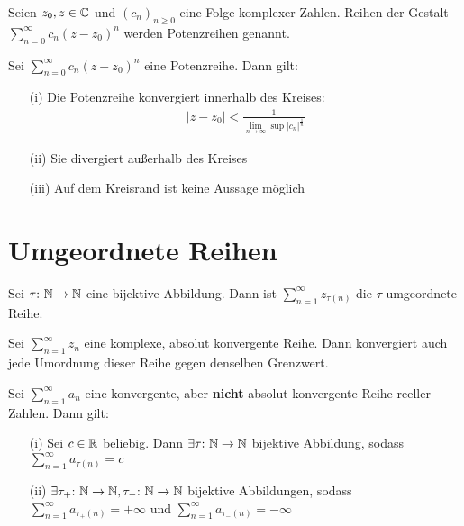 \begin{frameddefn}[Potenzreihen]
	Seien $z_0, z \in \mathbb{C}$ und $(c_n)_{n\geq 0}$ eine Folge komplexer Zahlen. Reihen der Gestalt\\ $\sum_{n=0}^{\infty} c_n (z-z_0)^n$ werden Potenzreihen genannt.
\end{frameddefn}

\begin{framedthm}
	Sei $\sum_{n=0}^{\infty} c_n (z-z_0)^n$ eine Potenzreihe. Dann gilt:
	\begin{enumerate}
		\item[(i)] Die Potenzreihe konvergiert innerhalb des Kreises:
		\begin{align*}
		|z-z_0| < \frac{1}{\lim\limits_{n \to \infty} \sup |c_n|^\frac{1}{n}}
		\end{align*}
		\item [(ii)] Sie divergiert außerhalb des Kreises
		\item[(iii)] Auf dem Kreisrand ist keine Aussage möglich
	\end{enumerate}
\end{framedthm}

\section{Umgeordnete Reihen}

\begin{frameddefn}
	Sei $\tau{:}\  \mathbb{N} \to \mathbb{N}$ eine bijektive Abbildung. Dann ist $\sum_{n=1}^{\infty} z_{\tau(n)}$ die $\tau$-umgeordnete Reihe.
\end{frameddefn}

\begin{framedthm}[Umordnungssatz]
	Sei $\sum_{n=1}^{\infty} z_n$ eine komplexe, absolut konvergente Reihe. Dann konvergiert auch jede Umordnung dieser Reihe gegen denselben Grenzwert.
\end{framedthm}

\begin{framedthm}
	Sei $\sum_{n=1}^{\infty} a_n$ eine konvergente, aber \textbf{nicht} absolut konvergente Reihe reeller Zahlen. Dann gilt:
	\begin{enumerate}
		\item[(i)] Sei $c \in \mathbb{R}$ beliebig. Dann $\exists \tau{:}\  \mathbb{N} \to \mathbb{N}$ bijektive Abbildung, sodass $\sum_{n=1}^{\infty} a_{\tau(n)} = c$
		\item[(ii)] $\exists \tau_{+}{:}\  \mathbb{N} \to \mathbb{N}, \tau_{-}{:}\  \mathbb{N} \to \mathbb{N}$ bijektive Abbildungen, sodass $\sum_{n=1}^{\infty} a_{\tau_{+}(n)} = +\infty$ und $\sum_{n=1}^{\infty} a_{\tau_{-}(n)} = -\infty$
	\end{enumerate}
\end{framedthm}

